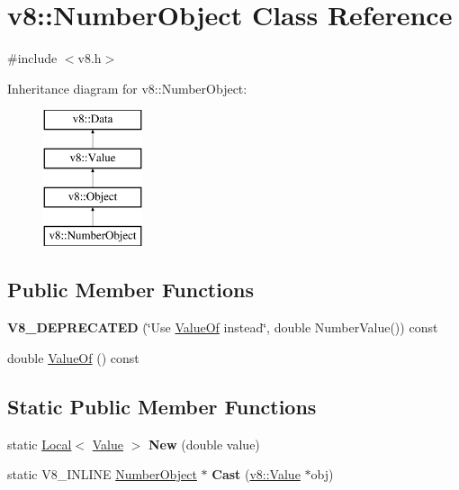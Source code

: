 \hypertarget{classv8_1_1_number_object}{}\section{v8\+:\+:Number\+Object Class Reference}
\label{classv8_1_1_number_object}


{\ttfamily \#include $<$v8.\+h$>$}

Inheritance diagram for v8\+:\+:Number\+Object\+:\begin{figure}[H]
\begin{center}
\leavevmode
\includegraphics[height=4.000000cm]{classv8_1_1_number_object}
\end{center}
\end{figure}
\subsection*{Public Member Functions}
\begin{DoxyCompactItemize}
\item 
\hypertarget{classv8_1_1_number_object_a07ff28668ac8f93092d0cec855f1b207}{}{\bfseries V8\+\_\+\+D\+E\+P\+R\+E\+C\+A\+T\+E\+D} (\char`\"{}Use \hyperlink{classv8_1_1_number_object_a40c7211d55bc2de1b23f475d1906b5bf}{Value\+Of} instead\char`\"{}, double Number\+Value()) const \label{classv8_1_1_number_object_a07ff28668ac8f93092d0cec855f1b207}

\item 
double \hyperlink{classv8_1_1_number_object_a40c7211d55bc2de1b23f475d1906b5bf}{Value\+Of} () const 
\end{DoxyCompactItemize}
\subsection*{Static Public Member Functions}
\begin{DoxyCompactItemize}
\item 
\hypertarget{classv8_1_1_number_object_a751b0759d8e5758fdf568975b865587c}{}static \hyperlink{classv8_1_1_local}{Local}$<$ \hyperlink{classv8_1_1_value}{Value} $>$ {\bfseries New} (double value)\label{classv8_1_1_number_object_a751b0759d8e5758fdf568975b865587c}

\item 
\hypertarget{classv8_1_1_number_object_a0dad558fde0ec8e51ff53a3e34dbce7e}{}static V8\+\_\+\+I\+N\+L\+I\+N\+E \hyperlink{classv8_1_1_number_object}{Number\+Object} $\ast$ {\bfseries Cast} (\hyperlink{classv8_1_1_value}{v8\+::\+Value} $\ast$obj)\label{classv8_1_1_number_object_a0dad558fde0ec8e51ff53a3e34dbce7e}

\end{DoxyCompactItemize}



